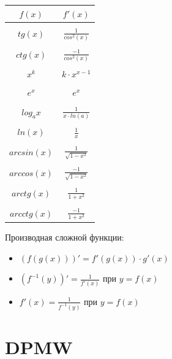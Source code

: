 \documentclass[oneside]{book}
\begin{document}
\begin{enumerate}
\begin{center}
      \begin{tabular}{c|c}
        $f(x)$ & $f'(x)$ \\
        \hline \\
        $tg(x)$ & $\frac{1}{cos^2(x)}$ \\
          \hline \\
        $ctg(x)$ & $\frac{-1}{cos^2(x)}$ \\
          \hline \\
        $x^k$ & $k \cdot x^{x-1}$ \\
          \hline \\
        $e^x$ & $e^x$ \\
          \hline \\
        $log_a x$ & $\frac{1}{x \cdot ln(a)}$ \\
          \hline \\
        $ln(x)$ & $\frac{1}{x}$ \\
          \hline \\
        $arcsin(x)$ & $\frac{1}{\sqrt{1 - x^2}}$ \\
          \hline \\
        $arccos(x)$ & $\frac{-1}{\sqrt{1 - x^2}}$ \\
          \hline \\
        $arctg(x)$ & $\frac{1}{1 + x^2}$ \\
          \hline \\
        $arcctg(x)$ & $\frac{-1}{1 + x^2}$ \\
      \end{tabular}
  \end{center}
Производная сложной функции:
\begin{itemize}
  \item $(f(g(x)))' = f'(g(x)) \cdot g'(x)$
  \item $(f^{-1}(y))' = \frac{1}{f'(x)}$ при $y = f(x)$
  \item $f'(x) = \frac{1}{f^{-1}(y)}$ при $y = f(x)$
\end{itemize}

\chapter{DPMW}
\pagebreak


\end{enumerate}
\end{document}
